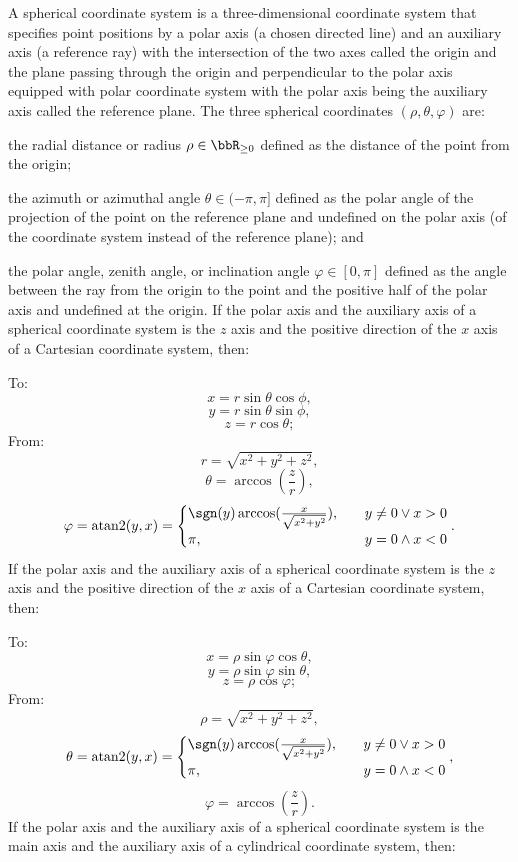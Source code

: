 \eit
{}
A spherical coordinate system is a three-dimensional coordinate system that specifies point positions by a polar axis (a chosen directed line) and an auxiliary axis (a reference ray) with the intersection of the two axes called the origin and the plane passing through the origin and perpendicular to the polar axis equipped with polar coordinate system with the polar axis being the auxiliary axis called the reference plane. The three spherical coordinates $(\rho,\theta,\varphi)$ are:
\bit
\item the radial distance or radius $\rho\in\bbR_{\geq 0}$ defined as the distance of the point from the origin;
\item the azimuth or azimuthal angle $\theta\in(-\pi,\pi]$ defined as the polar angle of the projection of the point on the reference plane and undefined on the polar axis (of the coordinate system instead of the reference plane); and
\item the polar angle, zenith angle, or inclination angle $\varphi\in[0,\pi]$ defined as the angle between the ray from the origin to the point and the positive half of the polar axis and undefined at the origin.
\eit
{}
If the polar axis and the auxiliary axis of a spherical coordinate system is the $z$ axis and the positive direction of the $x$ axis of a Cartesian coordinate system, then:

To:
\[x=r\sin\theta\cos\phi,\]
\[y=r\sin\theta\sin\phi,\]
\[z=r\cos\theta;\]
From:
\[r=\sqrt{x^2+y^2+z^2},\]
\[\theta=\arccos(\frac{z}{r}),\]
\[\varphi=\operatorname{atan2}(y,x)=\begin{cases}\sgn(y)\arccos(\frac{x}{\sqrt{x^2+y^2}}),\quad&y\neq 0\lor x>0\\\pi,\quad&y=0\land x<0\end{cases}.\]
If the polar axis and the auxiliary axis of a spherical coordinate system is the $z$ axis and the positive direction of the $x$ axis of a Cartesian coordinate system, then:

To:
\[x=\rho\sin\varphi\cos\theta,\]
\[y=\rho\sin\varphi\sin\theta,\]
\[z=\rho\cos\varphi;\]
From:
\[\rho=\sqrt{x^2+y^2+z^2},\]
\[\theta=\operatorname{atan2}(y,x)=\begin{cases}\sgn(y)\arccos(\frac{x}{\sqrt{x^2+y^2}}),\quad&y\neq 0\lor x>0\\\pi,\quad&y=0\land x<0\end{cases},\]
\[\varphi=\arccos(\frac{z}{r}).\]
If the polar axis and the auxiliary axis of a spherical coordinate system is the main axis and the auxiliary axis of a cylindrical coordinate system, then:

